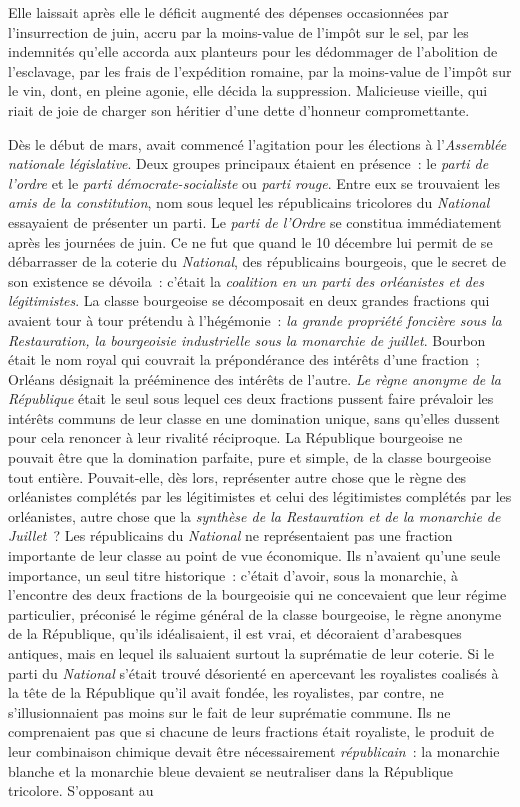 \documentclass[french,twoside]{book} %
\begin{document}
Elle laissait après elle le déficit augmenté des dépenses occasionnées par l’insurrection de juin, accru par la moins-value de l’impôt sur le sel, par les indemnités qu’elle accorda aux planteurs pour les dédommager de l’abolition de l’esclavage, par les frais de l’expédition romaine, par la moins-value de l’impôt sur le vin, dont, en pleine agonie, elle décida la suppression. Malicieuse vieille, qui riait de joie de charger son héritier d’une dette d’honneur compromettante.\par
Dès le début de mars, avait commencé l’agitation pour les élections à l’\emph{Assemblée nationale législative}. Deux groupes principaux étaient en présence : le \emph{parti de l’ordre} et le \emph{parti démocrate-socialiste} ou \emph{parti rouge}. Entre eux se trouvaient les \emph{amis de la constitution}, nom sous lequel les républicains tricolores du \emph{National} essayaient de présenter un parti. Le \emph{parti de l’Ordre} se constitua immédiatement après les journées de juin. Ce ne fut que quand le 10 décembre lui permit de se débarrasser de la coterie du \emph{National}, des républicains bourgeois, que le secret de son existence se dévoila : c’était la \emph{coalition en un parti des orléanistes et des légitimistes}. La classe bourgeoise se décomposait en deux grandes fractions qui avaient tour à tour prétendu à l’hégémonie : \emph{la grande propriété foncière sous la Restauration, la bourgeoisie industrielle sous la monarchie de juillet}. Bourbon était le nom royal qui couvrait la prépondérance des intérêts d’une fraction ; Orléans désignait la prééminence des intérêts de l’autre. \emph{Le règne anonyme de la République} était le seul sous lequel ces deux fractions pussent faire prévaloir les intérêts communs de leur classe en une domination unique, sans qu’elles dussent pour cela renoncer à leur rivalité réciproque. La République bourgeoise ne pouvait être que la domination parfaite, pure et simple, de la classe bourgeoise tout entière. Pouvait-elle, dès lors, représenter autre chose que le règne des orléanistes complétés par les légitimistes et celui des légitimistes complétés par les orléanistes, autre chose que la \emph{synthèse de la Restauration et de la monarchie de Juillet} ? Les républicains du \emph{National} ne représentaient pas une fraction importante de leur classe au point de vue économique. Ils n’avaient qu’une seule importance, un seul titre historique : c’était d’avoir, sous la monarchie, à l’encontre des deux fractions de la bourgeoisie qui ne concevaient que leur régime particulier, préconisé le régime général de la classe bourgeoise, le règne anonyme de la République, qu’ils idéalisaient, il est vrai, et décoraient d’arabesques antiques, mais en lequel ils saluaient surtout la suprématie de leur coterie. Si le parti du \emph{National} s’était trouvé désorienté en apercevant les royalistes coalisés à la tête de la République qu’il avait fondée, les royalistes, par contre, ne s’illusionnaient pas moins sur le fait de leur suprématie commune. Ils ne comprenaient pas que si chacune de leurs fractions était royaliste, le produit de leur combinaison chimique devait être nécessairement \emph{républicain} : la monarchie blanche et la monarchie bleue devaient se neutraliser dans la République tricolore. S’opposant au 
\end{document}
